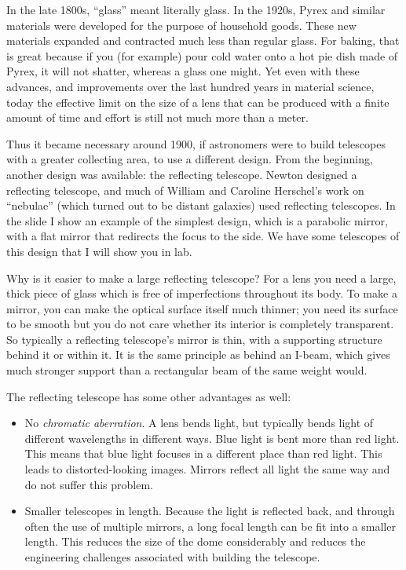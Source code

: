 \documentclass[12pt, preprint]{aastex}
\begin{document}
In the late 1800s, ``glass'' meant literally glass. In the 1920s,
Pyrex and similar materials were developed for the purpose of
household goods. These new materials expanded and contracted much less
than regular glass. For baking, that is great because if you (for
example) pour cold water onto a hot pie dish made of Pyrex, it will
not shatter, whereas a glass one might. Yet even with these advances,
and improvements over the last hundred years in material science,
today the effective limit on the size of a lens that can be produced
with a finite amount of time and effort is still not much more than a
meter.

Thus it became necessary around 1900, if astronomers were to build
telescopes with a greater collecting area, to use a different
design. From the beginning, another design was available: the
reflecting telescope.  Newton designed a reflecting telescope, and
much of William and Caroline Herschel's work on ``nebulae'' (which
turned out to be distant galaxies) used reflecting telescopes. In the
slide I show an example of the simplest design, which is a parabolic
mirror, with a flat mirror that redirects the focus to the side. We
have some telescopes of this design that I will show you in lab.

Why is it easier to make a large reflecting telescope? For a lens you
need a large, thick piece of glass which is free of imperfections
throughout its body. To make a mirror, you can make the optical
surface itself much thinner; you need its surface to be smooth but you
do not care whether its interior is completely transparent. So
typically a reflecting telescope's mirror is thin, with a supporting
structure behind it or within it. It is the same principle as behind
an I-beam, which gives much stronger support than a rectangular beam
of the same weight would.

The reflecting telescope has some other advantages as well:
\begin{itemize}
\item No {\it chromatic aberration}. A lens bends light, but typically
  bends light of different wavelengths in different ways. Blue light
  is bent more than red light. This means that blue light focuses in a
  different place than red light. This leads to distorted-looking
  images. Mirrors reflect all light the same way and do not suffer
  this problem.
\item Smaller telescopes in length. Because the light is reflected
  back, and through often the use of multiple mirrors, a long focal
  length can be fit into a smaller length. This reduces the size of
  the dome considerably and reduces the engineering challenges
  associated with building the telescope. 
\end{itemize}
\end{document}
